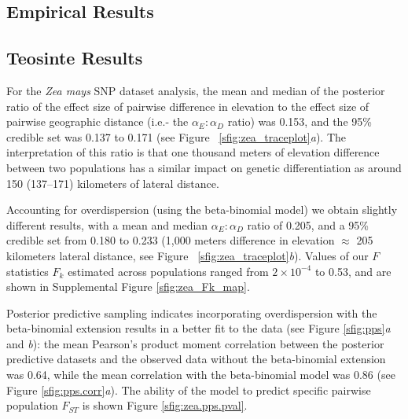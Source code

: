 \subsection*{Empirical Results}
\subsection*{Teosinte Results}
For the \emph{Zea mays} SNP dataset analysis, the mean and median of the posterior ratio of the effect size of pairwise difference in elevation to the effect size of pairwise geographic distance (i.e.- the $\alpha_{E} : \alpha_{D}$ ratio) was 0.153, and the 95\% credible set was 0.137 to 0.171 (see Figure ~\ref{sfig:zea_traceplot}\textit{a}).  The interpretation of this ratio is that one thousand meters of elevation difference between two populations has a similar impact on genetic differentiation as around 150 (137--171) kilometers of lateral distance. 

Accounting for overdispersion (using the beta-binomial model) we obtain slightly different results, with a mean and median $\alpha_{E} : \alpha_{D}$ ratio of 0.205, and a 95\% credible set from 0.180 to 0.233 (1,000 meters difference in elevation $\approx$ 205 kilometers lateral distance, see Figure ~\ref{sfig:zea_traceplot}\textit{b}).  
Values of our $F$ statistics $F_{k}$ estimated across populations ranged from $2\times 10^{-4}$ to 0.53, and are shown in Supplemental Figure \ref{sfig:zea_Fk_map}.  

Posterior predictive sampling indicates incorporating overdispersion with the beta-binomial extension results in a better fit to the data (see Figure \ref{sfig:pps}\textit{a} and \textit{b}): the mean Pearson's product moment correlation between the posterior predictive datasets and the observed data without the beta-binomial extension was 0.64, while the mean correlation with the beta-binomial model was 0.86 (see Figure \ref{sfig:pps.corr}\textit{a}).  The ability of the model to predict specific pairwise population $F_{ST}$ is shown Figure \ref{sfig:zea.pps.pval}.  

